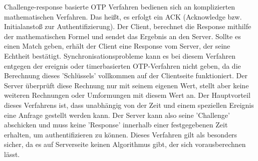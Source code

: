 Challenge-response basierte OTP Verfahren bedienen sich an komplizierten mathematischen Verfahren. Das heißt, es erfolgt ein ACK (Acknowledge bzw. Initialanstoß zur Authentifizierung). Der Client, berechnet die Response mithilfe der mathematischen Formel und sendet das Ergebnis an den Server. Sollte es einen Match geben, erhält der Client eine Response vom Server, der seine Echtheit bestätigt. Synchronisationsprobleme kann es bei diesem Verfahren entgegen der ereignis oder timerbasierten OTP-Verfahren nicht geben, da die Berechnung dieses 'Schlüssels' vollkommen auf der Clientseite funktioniert. Der Server überprüft diese Rechnung nur mit seinem eigenen Wert, stellt aber keine weiteren Rechnungen oder Umformungen mit diesem Wert an. Der Hauptvorteil dieses Verfahrens ist, dass unabhängig von der Zeit und einem speziellen Ereignis eine Anfrage gestellt werden kann. Der Server kann also seine 'Challenge' abschicken und muss keine 'Response' innerhalb einer festgegebenen Zeit erhalten, um authentifizieren zu können. Dieses Verfahren gilt als besonders sicher, da es auf Serverseite keinen Algorithmus gibt, der sich vorausberechnen lässt.

